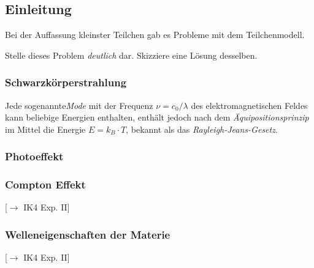 \documentclass{article}
\begin{document}
    \subsection*{Einleitung}
        Bei der Auffassung kleinster Teilchen gab es Probleme mit dem Teilchenmodell. 
        \begin{Aufgabe}
            \nr{} Stelle dieses Problem \emph{deutlich} dar. Skizziere eine Lösung desselben. 
        \end{Aufgabe}
        \subsubsection*{Schwarzkörperstrahlung}
            Jede sogenannte\emph{Mode} mit der Frequenz $\nu = c_0/\lambda$ des elektromagnetischen Feldes kann beliebige Energien enthalten, enthält jedoch nach dem \emph{Äquipositionsprinzip} im Mittel die Energie $E = k_B\cdot T$, bekannt als das \emph{Rayleigh-Jeans-Gesetz}. 

        \subsubsection*{Photoeffekt}


        \subsubsection*{Compton Effekt}
            [$\to$ IK4 Exp. II] 

        \subsubsection*{Welleneigenschaften der Materie}
            [$\to$ IK4 Exp. II]
\end{document}
